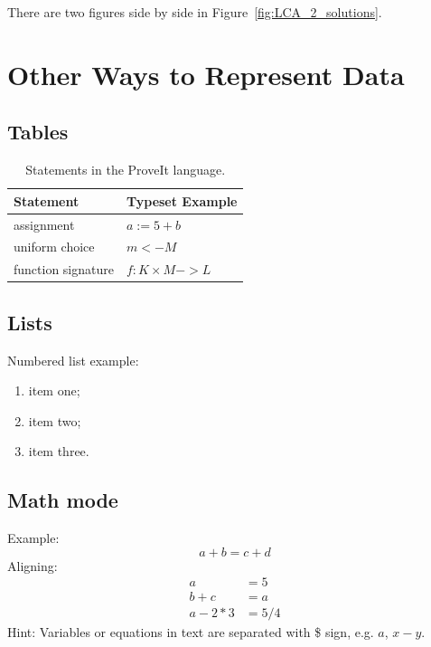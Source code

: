 \documentclass[12pt]{article}
\newcommand{\proveit}{ProveIt\xspace}
\begin{document}
There are two figures side by side in Figure~\ref{fig:LCA_2_solutions}.



\clearpage %
\section{Other Ways to Represent Data}

\subsection{Tables}

\begin{table}[h]
\centering
\caption{Statements in the \proveit language.}
\begin{tabular}{| l | l |}
	\hline
	\bf{Statement} & \bf{Typeset Example} \\
	\hline
	assignment & $a := 5 + b$ \\
	\hline
	uniform choice & $m <- M$ \\
	\hline
	function signature & $f : K \times M -> L$\\
	\hline
\end{tabular}
\label{tab:statements}
\end{table}


\subsection{Lists}

Numbered list example:
\begin{enumerate}
	\item item one; 
	\item item two;
	\item item three.
\end{enumerate} 

\subsection{Math mode}
Example:
\begin{equation}
a + b = c + d
\end{equation}
Aligning:
\begin{align*}
	a &= 5 \\
	b + c &= a \\
	a -2*3 &= 5/4
\end{align*}
Hint: Variables or equations in text are separated with \$ sign, e.g. $a$, $x - y$.
\end{document}
